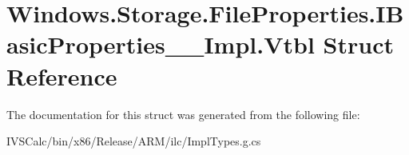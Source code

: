 \hypertarget{struct_windows_1_1_storage_1_1_file_properties_1_1_i_basic_properties_____impl_1_1_vtbl}{}\section{Windows.\+Storage.\+File\+Properties.\+I\+Basic\+Properties\+\_\+\+\_\+\+Impl.\+Vtbl Struct Reference}
\label{struct_windows_1_1_storage_1_1_file_properties_1_1_i_basic_properties_____impl_1_1_vtbl}


The documentation for this struct was generated from the following file\+:\begin{DoxyCompactItemize}
\item 
I\+V\+S\+Calc/bin/x86/\+Release/\+A\+R\+M/ilc/Impl\+Types.\+g.\+cs\end{DoxyCompactItemize}

